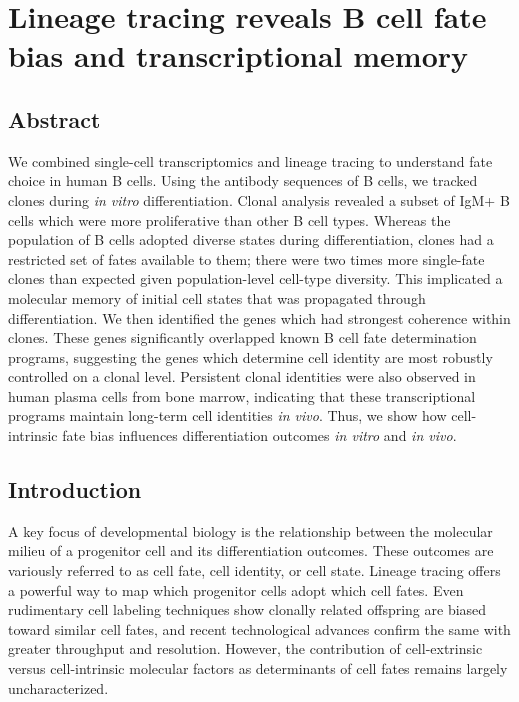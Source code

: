 \chapter{Lineage tracing reveals B cell fate bias and transcriptional memory}

\section{Abstract}
We combined single-cell transcriptomics and lineage tracing to understand fate choice in human B cells. Using the antibody sequences of B cells, we tracked clones during \textit{in vitro} differentiation. Clonal analysis revealed a subset of IgM+ B cells which were more proliferative than other B cell types. Whereas the population of B cells adopted diverse states during differentiation, clones had a restricted set of fates available to them; there were two times more single-fate clones than expected given population-level cell-type diversity. This implicated a molecular memory of initial cell states that was propagated through differentiation. We then identified the genes which had strongest coherence within clones. These genes significantly overlapped known B cell fate determination programs, suggesting the genes which determine cell identity are most robustly controlled on a clonal level. Persistent clonal identities were also observed in human plasma cells from bone marrow, indicating that these transcriptional programs maintain long-term cell identities \textit{in vivo}. Thus, we show how cell-intrinsic fate bias influences differentiation outcomes \textit{in vitro} and \textit{in vivo}. 

\section{Introduction}
A key focus of developmental biology is the relationship between the molecular milieu of a progenitor cell and its differentiation outcomes. These outcomes are variously referred to as cell fate, cell identity, or cell state. Lineage tracing offers a powerful way to map which progenitor cells adopt which cell fates. Even rudimentary cell labeling techniques show clonally related offspring are biased toward similar cell fates\cite{whitman_embryology_1878}, and recent technological advances confirm the same with greater throughput and resolution. However, the contribution of cell-extrinsic versus cell-intrinsic molecular factors as determinants of cell fates remains largely uncharacterized.

